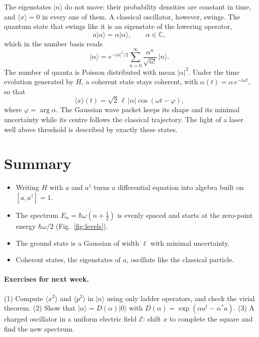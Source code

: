 \documentclass[10pt,twocolumn]{article}
\newcommand{\ad}{a^\dagger}
\newcommand{\ket}[1]{\lvert #1\rangle}
\begin{document}
The eigenstates $\ket{n}$ do not move: their probability densities are
constant in time, and $\langle x\rangle = 0$ in every one of them. A
classical oscillator, however, swings. The quantum state that swings like
it is an eigenstate of the lowering operator,
\begin{equation}
  a\ket{\alpha} = \alpha\ket{\alpha}, \qquad \alpha\in\mathbb{C},
\end{equation}
which in the number basis reads
\begin{equation}
  \ket{\alpha} = e^{-|\alpha|^2/2}\sum_{n=0}^{\infty}\frac{\alpha^n}{\sqrt{n!}}\,\ket{n}.
\end{equation}
The number of quanta is Poisson distributed with mean $|\alpha|^2$. Under
the time evolution generated by $H$, a coherent state stays coherent,
with $\alpha(t) = \alpha\,e^{-i\omega t}$, so that
\begin{equation}
  \langle x\rangle(t) = \sqrt{2}\,\ell\,|\alpha|\cos(\omega t - \varphi),
\end{equation}
where $\varphi = \arg\alpha$. The Gaussian wave packet keeps its shape
and its minimal uncertainty while its centre follows the classical
trajectory. The light of a laser well above threshold is described by
exactly these states.

\section{Summary}

\begin{itemize}
  \item Writing $H$ with $a$ and $\ad$ turns a differential equation into
        algebra built on $[a,\ad]=1$.
  \item The spectrum $E_n = \hbar\omega(n+\frac12)$ is evenly spaced and
        starts at the zero-point energy $\hbar\omega/2$
        (Fig.~\ref{fig:levels}).
  \item The ground state is a Gaussian of width $\ell$ with minimal
        uncertainty.
  \item Coherent states, the eigenstates of $a$, oscillate like the
        classical particle.
\end{itemize}

\paragraph{Exercises for next week.} (1) Compute $\langle x^2\rangle$ and
$\langle p^2\rangle$ in $\ket{n}$ using only ladder operators, and check
the virial theorem. (2) Show that $\ket{\alpha} = D(\alpha)\ket{0}$ with
$D(\alpha) = \exp(\alpha\ad - \alpha^*a)$. (3) A charged oscillator in a
uniform electric field $\mathcal{E}$: shift $x$ to complete the square and
find the new spectrum.
\end{document}
